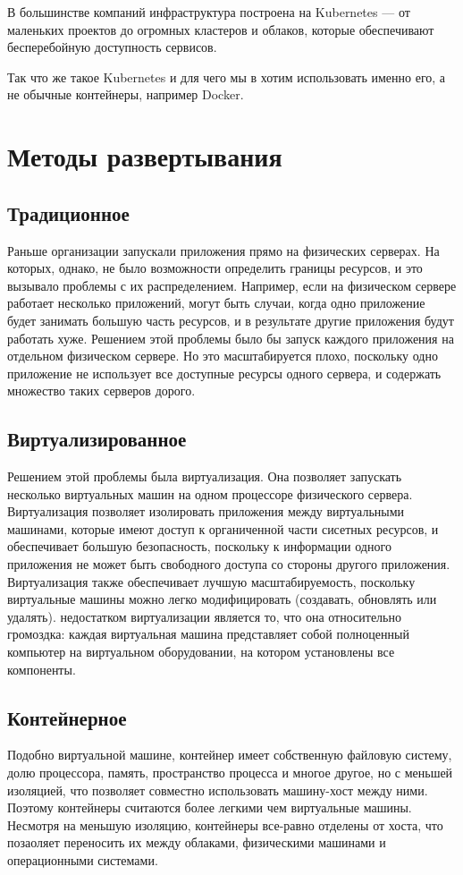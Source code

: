 \documentclass[a4page]{article}
\begin{document}
В большинстве компаний инфраструктура построена на Kubernetes --- от маленьких проектов до огромных кластеров и облаков, которые обеспечивают бесперебойную доступность сервисов.

Так что же такое Kubernetes и для чего мы в хотим использовать именно его, а не обычные контейнеры, например Docker.

\section{Методы развертывания}



\subsection{Традиционное}
Раньше организации запускали приложения прямо на физических серверах. На которых, однако, не было возможности определить границы ресурсов, и это вызывало проблемы с их распределением. Например, если на физическом сервере работает несколько приложений, могут быть случаи, когда одно приложение будет занимать большую часть ресурсов, и в результате другие приложения будут работать хуже. Решением этой проблемы было бы запуск каждого приложения на отдельном физическом сервере. Но это масштабируется плохо, поскольку одно приложение не использует все доступные ресурсы одного сервера, и содержать множество таких серверов дорого.

\subsection{Виртуализированное}
Решением этой проблемы была виртуализация. Она позволяет запускать несколько виртуальных машин на одном процессоре физического сервера. Виртуализация позволяет изолировать приложения между виртуальными машинами, которые имеют доступ к органиченной части сисетных ресурсов, и обеспечивает большую безопасность, поскольку к информации одного приложения не может быть свободного доступа со стороны другого приложения. Виртуализация также обеспечивает лучшую масштабируемость, поскольку виртуальные машины можно легко модифицировать (создавать, обновлять или удалять). недостатком виртуализации является то, что она относительно громоздка: каждая виртуальная машина представляет собой полноценный компьютер на виртуальном оборудовании, на котором установлены все компоненты.

\subsection{Контейнерное}
Подобно виртуальной машине, контейнер имеет собственную файловую систему, долю процессора, память, пространство процесса и многое другое, но с меньшей изоляцией, что позволяет совместно использовать машину-хост между ними. Поэтому контейнеры считаются более легкими чем виртуальные машины. Несмотря на меньшую изоляцию, контейнеры все-равно отделены от хоста, что позаоляет переносить их между облаками, физическими машинами и операционными системами.
\end{document}
